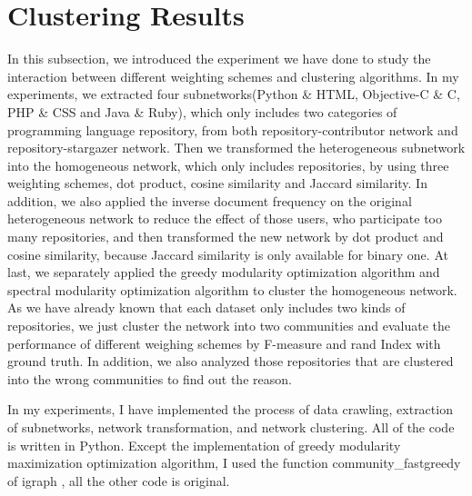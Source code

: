 \documentclass[12pt,oneside,final]{vlsithesis}
\begin{document}
\section{Clustering Results}
In this subsection, we introduced the experiment we have done to study the interaction between different weighting schemes and clustering algorithms. In my experiments, we extracted four subnetworks(Python \& HTML, Objective-C \& C, PHP \& CSS and Java \& Ruby), which only includes two categories of programming language repository, from both repository-contributor network and repository-stargazer network. Then we transformed the heterogeneous subnetwork into the homogeneous network, which only includes repositories, by using three weighting schemes, dot product, cosine similarity and Jaccard similarity. In addition, we also applied the inverse document frequency on the original heterogeneous network to reduce the effect of those users, who participate too many repositories, and then transformed the new network by dot product and cosine similarity, because Jaccard similarity is only available for binary one. At last, we separately applied the greedy modularity optimization algorithm and spectral modularity optimization algorithm to cluster the homogeneous network. As we have already known that each dataset only includes two kinds of repositories, we just cluster the network into two communities and  evaluate the performance of different weighing schemes by F-measure and rand Index with ground truth. In addition, we also analyzed those repositories that are clustered into the wrong communities to find out the reason. 

In my experiments, I have implemented the process of data crawling, extraction of subnetworks, network transformation, and network clustering. All of the code is written in Python. Except the implementation of greedy modularity maximization optimization algorithm, I used the function community\_fastgreedy of igraph \cite{igraph}, all the other code is original.
\end{document}
